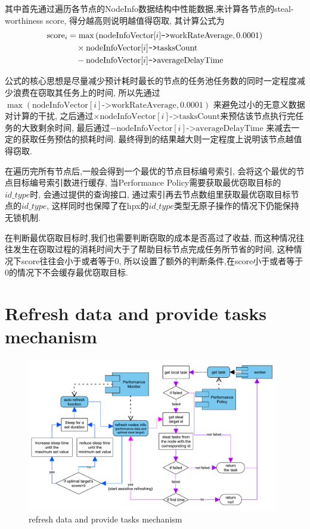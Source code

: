 \documentclass{mproj}
\begin{document}
其中首先通过遍历各节点的NodeInfo数据结构中性能数据,来计算各节点的steal-worthiness score,
得分越高则说明越值得窃取,
其计算公式为
\begin{align}
    \text{score}_i & = \max\left(\text{nodeInfoVector}[i]\texttt{->}\text{workRateAverage}, 0.0001 \right) \notag \\
                   & \quad\times \text{nodeInfoVector}[i]\texttt{->}\text{tasksCount} \notag                      \\
                   & \quad - \text{nodeInfoVector}[i]\texttt{->}\text{averageDelayTime} \label{eq:score}
\end{align}

公式的核心思想是尽量减少预计耗时最长的节点的任务池任务数的同时一定程度减少浪费在窃取其任务上的时间,
所以先通过$\max\left(\text{nodeInfoVector}[i]\texttt{->}\text{workRateAverage}, 0.0001 \right)$
来避免过小的无意义数据对计算的干扰,
之后通过$\times \text{nodeInfoVector}[i]\texttt{->}\text{tasksCount}$来预估该节点执行完任务的大致剩余时间,
最后通过$- \text{nodeInfoVector}[i]\texttt{->}\text{averageDelayTime}$
来减去一定的获取任务预估的损耗时间.
最终得到的结果越大则一定程度上说明该节点越值得窃取.

在遍历完所有节点后,一般会得到一个最优的节点目标编号索引,
会将这个最优的节点目标编号索引数进行缓存,
当Performance Policy需要获取最优窃取目标的$id\_type$时,
会通过提供的查询接口,
通过索引再去节点数组里获取最优窃取目标节点的$id\_type$,
这样同时也保障了在hpx的$id\_type$类型无原子操作的情况下仍能保持无锁机制.

在判断最优窃取目标时,我们也需要判断窃取的成本是否高过了收益,
而这种情况往往发生在窃取过程的消耗时间大于了帮助目标节点完成任务所节省的时间,
这种情况下score往往会小于或者等于0,
所以设置了额外的判断条件,在score小于或者等于0的情况下不会缓存最优窃取目标.


\section{Refresh data and provide tasks mechanism}

\begin{figure}[h]
    \centering %
    \includegraphics[width=0.98\textwidth]{images/refresh.pdf} %
    \caption{refresh data and provide tasks mechanism} %
    \label{fig:refresh_provide} %
\end{figure}
\FloatBarrier
\end{document}
